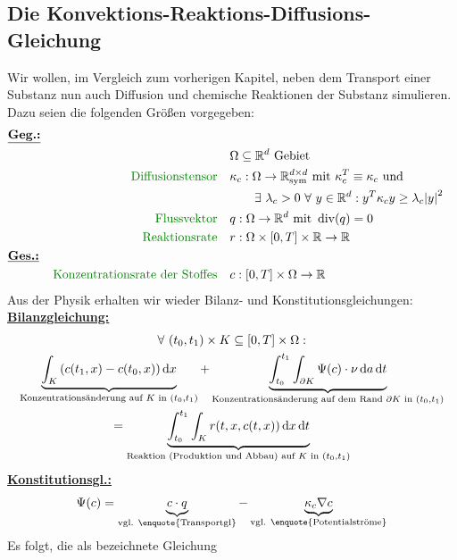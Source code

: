\subsection{Die Konvektions-Reaktions-Diffusions-Gleichung}
Wir wollen, im Vergleich zum vorherigen Kapitel, neben dem Transport einer Substanz nun auch Diffusion und chemische Reaktionen der Substanz simulieren. Dazu seien die folgenden Größen vorgegeben:
\begin{align*}
&\text{\underline{\textbf{Geg.:}}}\\
&&&&&\Omega \subseteq \R^d \text{ Gebiet}\\
&&\text{\defi{Diffusionstensor}} &&&\kappa_c:\Omega \to \R^{d \times d}_{\sym}\text{ mit } \kappa_c^T \equiv \kappa_c \text{ und }\\
								&&&&& \qquad \exists \ \lambda_c > 0 \ \forall \ y \in \R^d: y^T \kappa_c y \geq \lambda_c \abs{y}^2\\
&&\text{\defi{Flussvektor}} &&&q:\Omega \to \R^d \text{ mit } \dive(q) = 0\\
&&\text{\defi{Reaktionsrate}} &&&r:\Omega\times[0,T]\times\R \to \R\\
&\text{\underline{\textbf{Ges.:}}}\\
	&&\text{\defi{Konzentrationsrate der Stoffes}} &&&c:[0,T]\times\Omega \to \R
\end{align*}
Aus der Physik erhalten wir wieder Bilanz- und Konstitutionsgleichungen:\\
\underline{\textbf{Bilanzgleichung:}}
\begin{gather*}
\forall \ (t_0,t_1)\times K \subseteq [0,T] \times \Omega: \\
\underbrace{\int_K \left( c(t_1,x) - c(t_0,x) \right) \mathop{}\!\mathrm{d} x}_{\text{Konzentrationsänderung auf } K\text{ in } (t_0,t_1)} + \underbrace{\int_{t_0}^{t_1} \int_{\partial K} \Psi(c) \cdot \nu \mathop{}\!\mathrm{d} a \mathop{}\!\mathrm{d} t }_{\text{Konzentrationsänderung auf dem Rand } \partial K \text{ in } (t_0,t_1) } \\
= \underbrace{\int_{t_0}^{t_1} \int_K r(t,x,c(t,x)) \mathop{}\!\mathrm{d} x \mathop{}\!\mathrm{d} t}_{\text{Reaktion (Produktion und Abbau) auf } K \text{ in } (t_0,t_1) }
\end{gather*}
\underline{\textbf{Konstitutionsgl.:}}
\begin{gather*}
	\Psi(c) = \underbrace{c \cdot q}_{\text{vgl. \enquote{Transportgl}}} - \underbrace{\kappa_c \nabla c}_{\text{vgl. \enquote{Potentialströme}}}
\end{gather*}
Es folgt, die als  bezeichnete Gleichung
